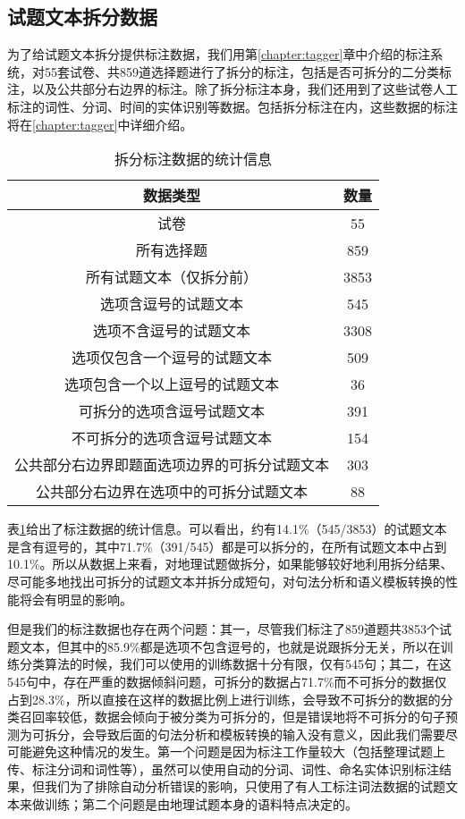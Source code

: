 \documentclass[master, winfont]{njuthesis}
\begin{document}
\subsection{试题文本拆分数据}
\label{splitdata}
为了给试题文本拆分提供标注数据，我们用第\ref{chapter:tagger}章中介绍的标注系统，对55套试卷、共859道选择题进行了拆分的标注，包括是否可拆分的二分类标注，以及公共部分右边界的标注。除了拆分标注本身，我们还用到了这些试卷人工标注的词性、分词、时间的实体识别等数据。包括拆分标注在内，这些数据的标注将在\ref{chapter:tagger}中详细介绍。

\begin{table}[!htbp]
\begin{center}
\begin{tabular}{c|c}
\hline {数据类型} & {数量}\\
\hline 试卷 & 55\\
\hline 所有选择题 & 859 \\
\hline 所有试题文本（仅拆分前） & 3853\\
\hline 选项含逗号的试题文本 & 545\\
\hline 选项不含逗号的试题文本 & 3308 \\
\hline 选项仅包含一个逗号的试题文本 & 509\\
\hline 选项包含一个以上逗号的试题文本 & 36\\
\hline 可拆分的选项含逗号试题文本 & 391\\
\hline 不可拆分的选项含逗号试题文本 & 154\\
\hline 公共部分右边界即题面选项边界的可拆分试题文本 & 303 \\
\hline 公共部分右边界在选项中的可拆分试题文本 & 88 \\
\hline
\end{tabular}
\end{center}
\caption{\label{data_count} 拆分标注数据的统计信息}
\end{table}

表\ref{data_count}给出了标注数据的统计信息。可以看出，约有14.1\%（545/3853）的试题文本是含有逗号的，其中71.7\%（391/545）都是可以拆分的，在所有试题文本中占到10.1\%。所以从数据上来看，对地理试题做拆分，如果能够较好地利用拆分结果、尽可能多地找出可拆分的试题文本并拆分成短句，对句法分析和语义模板转换的性能将会有明显的影响。

但是我们的标注数据也存在两个问题：其一，尽管我们标注了859道题共3853个试题文本，但其中的85.9\%都是选项不包含逗号的，也就是说跟拆分无关，所以在训练分类算法的时候，我们可以使用的训练数据十分有限，仅有545句；其二，在这545句中，存在严重的数据倾斜问题，可拆分的数据占71.7\%而不可拆分的数据仅占到28.3\%，所以直接在这样的数据比例上进行训练，会导致不可拆分的数据的分类召回率较低，数据会倾向于被分类为可拆分的，但是错误地将不可拆分的句子预测为可拆分，会导致后面的句法分析和模板转换的输入没有意义，因此我们需要尽可能避免这种情况的发生。第一个问题是因为标注工作量较大（包括整理试题上传、标注分词和词性等），虽然可以使用自动的分词、词性、命名实体识别标注结果，但我们为了排除自动分析错误的影响，只使用了有人工标注词法数据的试题文本来做训练；第二个问题是由地理试题本身的语料特点决定的。
\end{document}

